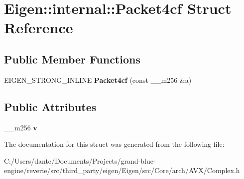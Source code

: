 \hypertarget{struct_eigen_1_1internal_1_1_packet4cf}{}\section{Eigen\+::internal\+::Packet4cf Struct Reference}
\label{struct_eigen_1_1internal_1_1_packet4cf}
\subsection*{Public Member Functions}
\begin{DoxyCompactItemize}
\item 
\mbox{\label{struct_eigen_1_1internal_1_1_packet4cf_a680cd59d1fc53b23b55be6d30016dad6}} 
E\+I\+G\+E\+N\+\_\+\+S\+T\+R\+O\+N\+G\+\_\+\+I\+N\+L\+I\+NE {\bfseries Packet4cf} (const \+\_\+\+\_\+m256 \&a)
\end{DoxyCompactItemize}
\subsection*{Public Attributes}
\begin{DoxyCompactItemize}
\item 
\mbox{\label{struct_eigen_1_1internal_1_1_packet4cf_a8ee32107cbfc9c17077f3b68d8f61e75}} 
\+\_\+\+\_\+m256 {\bfseries v}
\end{DoxyCompactItemize}


The documentation for this struct was generated from the following file\+:\begin{DoxyCompactItemize}
\item 
C\+:/\+Users/dante/\+Documents/\+Projects/grand-\/blue-\/engine/reverie/src/third\+\_\+party/eigen/\+Eigen/src/\+Core/arch/\+A\+V\+X/Complex.\+h\end{DoxyCompactItemize}
